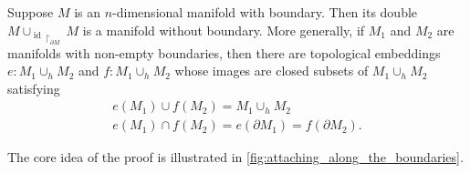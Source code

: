 \documentclass[notoc,notitlepage]{tufte-book}
\DeclareMathOperator{\id}{id}
\begin{document}
\begin{lemma}\label{lemma:attaching_manifolds_along_their_boundaries}
  Suppose $M$ is an $n$-dimensional manifold with boundary. Then its double 
  $M \cup_{\id \restriction_{\partial M}} M$ is a manifold without boundary.
  More generally, if $M_1$ and $M_2$ are manifolds with non-empty boundaries, then there are
  topological embeddings $e : M_1 \cup_h M_2$ and $f : M_1 \cup_h M_2$ whose images are closed
  subsets of $M_1 \cup_h M_2$ satisfying
  \begin{gather*}
    e(M_1) \cup f(M_2) = M_1 \cup_h M_2 \\
    e(M_1) \cap f(M_2) = e(\partial M_1) = f(\partial M_2).
  \end{gather*}
\end{lemma}

The core idea of the proof is illustrated in \cref{fig:attaching_along_the_boundaries}.
\end{document}
